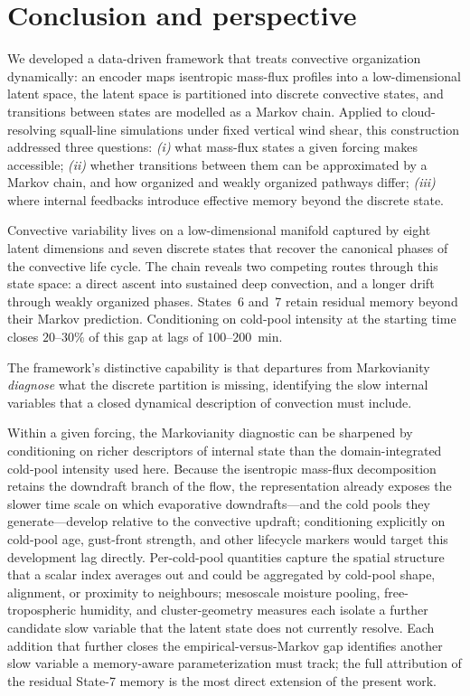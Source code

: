 \documentclass[11pt]{article}
\begin{document}
\section{Conclusion and perspective}\label{sec:conclusion}\label{sec:discussion}
We developed a data-driven framework that treats convective organization dynamically: an encoder maps isentropic mass-flux profiles into a low-dimensional latent space, the latent space is partitioned into discrete convective states, and transitions between states are modelled as a Markov chain. Applied to cloud-resolving squall-line simulations under fixed vertical wind shear, this construction addressed three questions: \emph{(i)} what mass-flux states a given forcing makes accessible; \emph{(ii)} whether transitions between them can be approximated by a Markov chain, and how organized and weakly organized pathways differ; \emph{(iii)} where internal feedbacks introduce effective memory beyond the discrete state.

Convective variability lives on a low-dimensional manifold captured by eight latent dimensions and seven discrete states that recover the canonical phases of the convective life cycle. The chain reveals two competing routes through this state space: a direct ascent into sustained deep convection, and a longer drift through weakly organized phases. States~6 and~7 retain residual memory beyond their Markov prediction. Conditioning on cold-pool intensity at the starting time closes $20$--$30\%$ of this gap at lags of $100$--$200$~min.

The framework's distinctive capability is that departures from Markovianity \emph{diagnose} what the discrete partition is missing, identifying the slow internal variables that a closed dynamical description of convection must include.

Within a given forcing, the Markovianity diagnostic can be sharpened by conditioning on richer descriptors of internal state than the domain-integrated cold-pool intensity used here. Because the isentropic mass-flux decomposition retains the downdraft branch of the flow, the representation already exposes the slower time scale on which evaporative downdrafts---and the cold pools they generate---develop relative to the convective updraft; conditioning explicitly on cold-pool age, gust-front strength, and other lifecycle markers would target this development lag directly. Per-cold-pool quantities capture the spatial structure that a scalar index averages out and could be aggregated by cold-pool shape, alignment, or proximity to neighbours; mesoscale moisture pooling, free-tropospheric humidity, and cluster-geometry measures each isolate a further candidate slow variable that the latent state does not currently resolve. Each addition that further closes the empirical-versus-Markov gap identifies another slow variable a memory-aware parameterization must track; the full attribution of the residual State-7 memory is the most direct extension of the present work.
\end{document}
